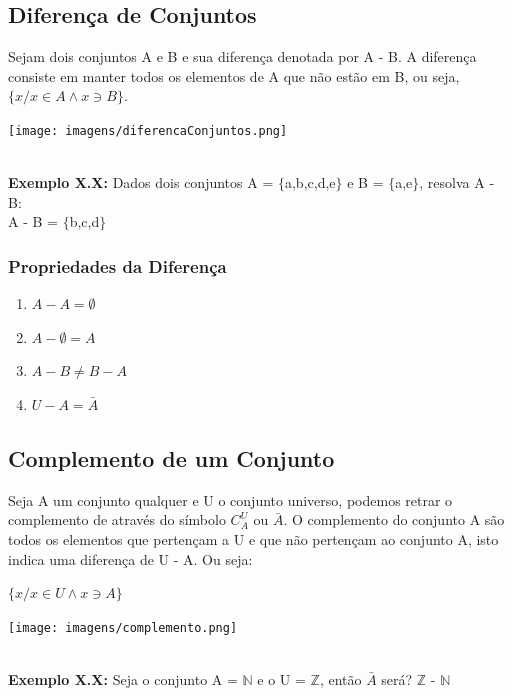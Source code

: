 \documentclass[a4paper,12pt,twoside,BCOR=10mm]{scrbook}
\begin{document}
\begin{titlepage}
\subsection{Diferença de Conjuntos}
Sejam dois conjuntos A e B e sua diferença denotada por A - B. A diferença consiste em manter todos os elementos de A que não estão em B, ou seja, $\{ x/ x \in A \wedge x \ni B \}$.

\begin{center}
	\texttt{[image: imagens/diferencaConjuntos.png]}
\end{center}
\\
\textbf{Exemplo X.X:} Dados dois conjuntos A = $\{$a,b,c,d,e$\}$ e B = $\{$a,e$\}$, resolva A - B:
\\
A - B = $\{$b,c,d$\}$\\


\subsubsection{Propriedades da Diferença}
\begin{enumerate}
\item $A - A = \emptyset$
\item $A - \emptyset = A$
\item $A - B \neq B - A$
\item $U - A = \bar{A}$
\end{enumerate}

\subsection{Complemento de um Conjunto}
Seja A um conjunto qualquer e U o conjunto universo, podemos retrar o complemento de através do símbolo $C_{A}^{U}$ ou $\bar{A}$. O complemento do conjunto A são todos os elementos que pertençam a U e que não pertençam ao conjunto A, isto indica uma diferença de U - A. Ou seja:
\\
\begin{center}
$\{x / x \in U \wedge x \ni A \}$
\end{center}

\begin{center}
	\texttt{[image: imagens/complemento.png]}
\end{center}

\\
\textbf{Exemplo X.X:} Seja o conjunto A = $\mathbb{N}$ e o U = $\mathbb{Z}$, então $\bar{A}$ será? $\mathbb{Z}$ - $\mathbb{N}$
\\


\end{titlepage}
\end{document}
